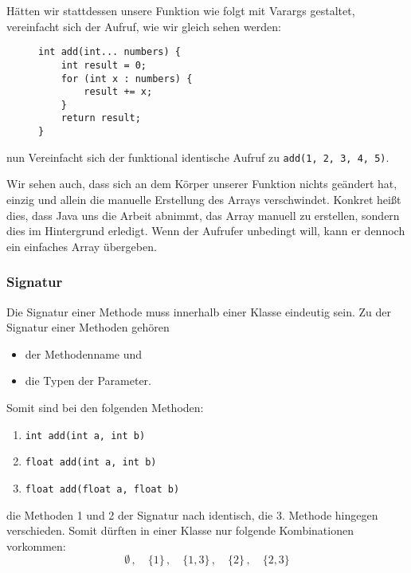 			Hätten wir stattdessen unsere Funktion wie folgt mit Varargs gestaltet, vereinfacht sich der Aufruf, wie wir gleich sehen werden:
			\begin{figure}[H]
				\centering
				\begin{lstlisting}
int add(int... numbers) {
	int result = 0;
	for (int x : numbers) {
		result += x;
	}
	return result;
}
				\end{lstlisting}
			\end{figure}
			nun Vereinfacht sich der funktional identische Aufruf zu \lstinline|add(1, 2, 3, 4, 5)|.
			
			Wir sehen auch, dass sich an dem Körper unserer Funktion nichts geändert hat, einzig und allein die manuelle Erstellung des Arrays verschwindet. Konkret heißt dies, dass Java uns die Arbeit abnimmt, das Array manuell zu erstellen, sondern dies im Hintergrund erledigt. Wenn der Aufrufer unbedingt will, kann er dennoch ein einfaches Array übergeben.
			

\subsubsection{Signatur}
	Die Signatur einer Methode muss innerhalb einer Klasse eindeutig sein. Zu der Signatur einer Methoden gehören
	\begin{itemize}
		\item der Methodenname und
		\item die Typen der Parameter.
	\end{itemize}

	Somit sind bei den folgenden Methoden:
	\begin{enumerate}
		\item \lstinline|int add(int a, int b)|
		\item \lstinline|float add(int a, int b)|
		\item \lstinline|float add(float a, float b)|
	\end{enumerate}
	die Methoden 1 und 2 der Signatur nach identisch, die 3. Methode hingegen verschieden. Somit dürften in einer Klasse nur folgende Kombinationen vorkommen:
	\begin{equation*}
		\emptyset \,,\quad \{ 1 \} \,,\quad \{ 1, 3 \} \,,\quad \{ 2 \} \,,\quad \{ 2, 3 \}
	\end{equation*}

